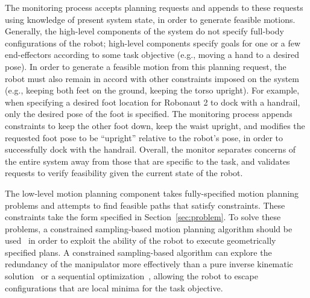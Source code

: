 The monitoring process accepts planning requests and appends to these requests using knowledge of present system state, in order to generate feasible motions.
Generally, the high-level components of the system do not specify full-body configurations of the robot; high-level components specify goals for one or a few end-effectors according to some task objective (e.g., moving a hand to a desired pose).
In order to generate a feasible motion from this planning request, the robot must also remain in accord with other constraints imposed on the system (e.g., keeping both feet on the ground, keeping the torso upright).
For example, when specifying a desired foot location for Robonaut 2 to dock with a handrail, only the desired pose of the foot is specified.
The monitoring process appends constraints to keep the other foot down, keep the waist upright, and modifies the requested foot pose to be ``upright'' relative to the robot's pose, in order to successfully dock with the handrail.
Overall, the monitor separates concerns of the entire system away from those that are specific to the task, and validates requests to verify feasibility given the current state of the robot.

The low-level motion planning component takes fully-specified motion planning problems and attempts to find feasible paths that satisfy constraints.
These constraints take the form specified in Section~\ref{sec:problem}.
To solve these problems, a constrained sampling-based motion planning algorithm should be used~\cite{Berenson2011, Jaillet2013, Kim2016} in order to exploit the ability of the robot to execute geometrically specified plans.
A constrained sampling-based algorithm can explore the redundancy of the manipulator more effectively than a pure inverse kinematic solution~\cite{Beeson-tamp-16} or a sequential optimization~\cite{Sentis2005, Schulman2014}, allowing the robot to escape configurations that are local minima for the task objective.

